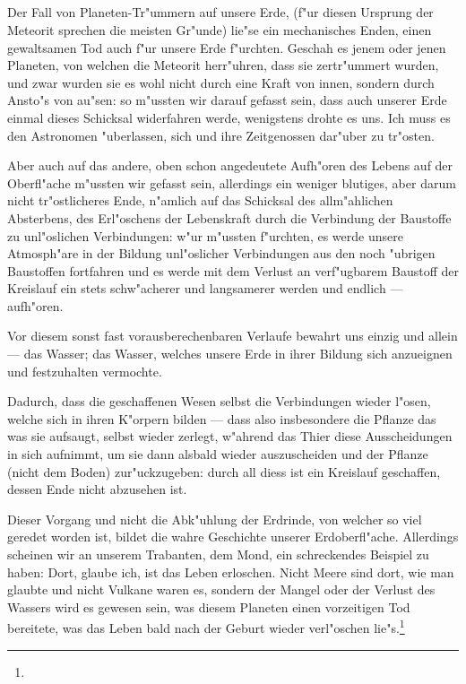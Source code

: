 \documentclass[a4paper, 11pt, oneside]{article}
\begin{document}
\subsection{}
\paragraph{}
Der Fall von Planeten-Tr"ummern auf unsere Erde, (f"ur diesen Ursprung der Meteorit sprechen die meisten Gr"unde) lie"se ein mechanisches Enden, einen gewaltsamen Tod auch f"ur unsere Erde f"urchten. Geschah es jenem oder jenen Planeten, von welchen die Meteorit herr"uhren, dass sie zertr"ummert wurden, und zwar wurden sie es wohl nicht durch eine Kraft von innen, sondern durch Ansto"s von au"sen: so m"ussten wir darauf gefasst sein, dass auch unserer Erde einmal dieses Schicksal widerfahren werde, wenigstens drohte es uns. Ich muss es den Astronomen "uberlassen, sich und ihre Zeitgenossen dar"uber zu tr"osten.

Aber auch auf das andere, oben schon angedeutete Aufh"oren des Lebens auf der Oberfl"ache m"ussten wir gefasst sein, allerdings ein weniger blutiges, aber darum nicht tr"ostlicheres Ende, n"amlich auf das Schicksal des allm"ahlichen Absterbens, des Erl"oschens der Lebenskraft durch die Verbindung der Baustoffe zu unl"oslichen Verbindungen: w"ur m"ussten f"urchten, es werde unsere Atmosph"are in der Bildung unl"oslicher Verbindungen aus den noch "ubrigen Baustoffen fortfahren und es werde mit dem Verlust an verf"ugbarem Baustoff der Kreislauf ein stets schw"acherer und langsamerer werden und endlich --- aufh"oren.

Vor diesem sonst fast vorausberechenbaren Verlaufe bewahrt uns einzig und allein --- das Wasser; das Wasser, welches unsere Erde in ihrer Bildung sich anzueignen und festzuhalten vermochte.

Dadurch, dass die geschaffenen Wesen selbst die Verbindungen wieder l"osen, welche sich in ihren K"orpern bilden --- dass also insbesondere die Pflanze das was sie aufsaugt, selbst wieder zerlegt, w"ahrend das Thier diese Ausscheidungen in sich aufnimmt, um sie dann alsbald wieder auszuscheiden und der Pflanze (nicht dem Boden) zur"uckzugeben: durch all diess ist ein Kreislauf geschaffen, dessen Ende nicht abzusehen ist.

Dieser Vorgang und nicht die Abk"uhlung der Erdrinde, von welcher so viel geredet worden ist, bildet die wahre Geschichte unserer Erdoberfl"ache. Allerdings scheinen wir an unserem Trabanten, dem Mond, ein schreckendes Beispiel zu haben: Dort, glaube ich, ist das Leben erloschen. Nicht Meere sind dort, wie man glaubte und nicht Vulkane waren es, sondern der Mangel oder der Verlust des Wassers wird es gewesen sein, was diesem Planeten einen vorzeitigen Tod bereitete, was das Leben bald nach der Geburt wieder verl"oschen lie"s.\footnote{}
\end{document}
